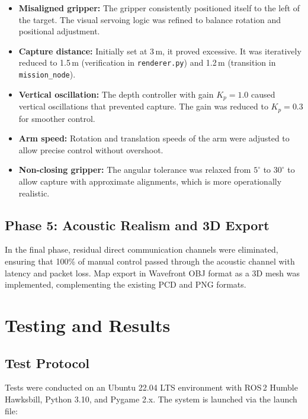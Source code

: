 \documentclass[10pt,twocolumn,letterpaper]{article}
\begin{document}
\begin{itemize}[leftmargin=*,itemsep=2pt]
    \item \textbf{Misaligned gripper:} The gripper consistently positioned itself to the left of the target. The visual servoing logic was refined to balance rotation and positional adjustment.
    \item \textbf{Capture distance:} Initially set at 3\,m, it proved excessive. It was iteratively reduced to 1.5\,m (verification in \texttt{renderer.py}) and 1.2\,m (transition in \texttt{mission\_node}).
    \item \textbf{Vertical oscillation:} The depth controller with gain $K_p = 1.0$ caused vertical oscillations that prevented capture. The gain was reduced to $K_p = 0.3$ for smoother control.
    \item \textbf{Arm speed:} Rotation and translation speeds of the arm were adjusted to allow precise control without overshoot.
    \item \textbf{Non-closing gripper:} The angular tolerance was relaxed from $5^{\circ}$ to $30^{\circ}$ to allow capture with approximate alignments, which is more operationally realistic.
\end{itemize}

\subsection{Phase 5: Acoustic Realism and 3D Export}

In the final phase, residual direct communication channels were eliminated, ensuring that 100\% of manual control passed through the acoustic channel with latency and packet loss. Map export in Wavefront OBJ format as a 3D mesh was implemented, complementing the existing PCD and PNG formats.

\section{Testing and Results}
\label{sec:results}

\subsection{Test Protocol}

Tests were conducted on an Ubuntu 22.04 LTS environment with ROS\,2 Humble Hawksbill, Python 3.10, and Pygame 2.x. The system is launched via the launch file:
\end{document}
